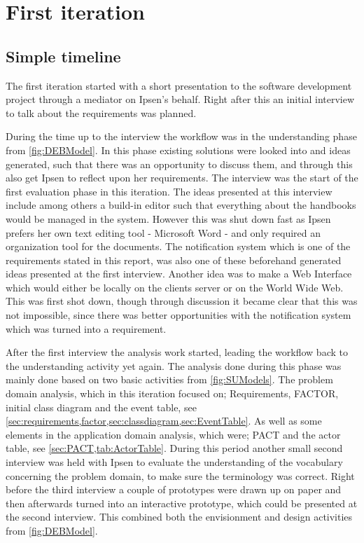 \section{First iteration}\label{sec:Iteration1}
\subsection{Simple timeline}\label{sec:1-simpleTime}
The first iteration started with a short presentation to the software development project through a mediator on Ipsen's behalf.
Right after this an initial interview to talk about the requirements was planned.

During the time up to the interview the workflow was in the understanding phase from \cref{fig:DEBModel}.
In this phase existing solutions were looked into and ideas generated, such that there was an opportunity to discuss them, and through this also get Ipsen to reflect upon her requirements.
The interview was the start of the first evaluation phase in this iteration.
The ideas presented at this interview include among others a build-in editor such that everything about the handbooks would be managed in the system.
However this was shut down fast as Ipsen prefers her own text editing tool - Microsoft Word - and only required an organization tool for the documents.
The notification system which is one of the requirements stated in this report, was also one of these beforehand generated ideas presented at the first interview. 
Another idea was to make a Web Interface which would either be locally on the clients server or on the World Wide Web.
This was first shot down, though through discussion it became clear that this was not impossible, since there was better opportunities with the notification system which was turned into a requirement.

After the first interview the analysis work started, leading the workflow back to the understanding activity yet again.
The analysis done during this phase was mainly done based on two basic activities from \cref{fig:SUModels}.
The problem domain analysis, which in this iteration focused on; Requirements, FACTOR, initial class diagram and the event table, see \cref{sec:requirements,factor,sec:classdiagram,sec:EventTable}.
As well as some elements in the application domain analysis, which were; PACT and the actor table, see \cref{sec:PACT,tab:ActorTable}.
During this period another small second interview was held with Ipsen to evaluate the understanding of the vocabulary concerning the problem domain, to make sure the terminology was correct.
Right before the third interview a couple of prototypes were drawn up on paper and then afterwards turned into an interactive prototype, which could be presented at the second interview.
This combined both the envisionment and design activities from \cref{fig:DEBModel}.


